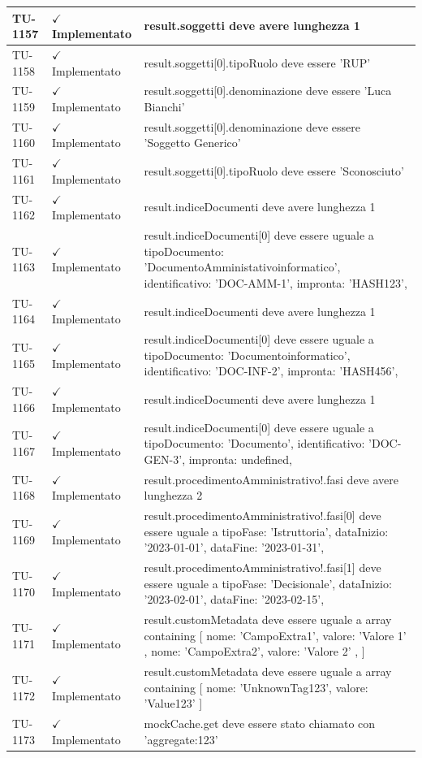 ﻿\documentclass[a4paper,12pt]{article}
\newcommand{\ok}{\textcolor{green!60!black}{$\checkmark$ Implementato}}
\begin{document}
\begin{longtable}{|p{2cm}|p{3.5cm}|p{9.5cm}|}
\hline
TU-1157 & \ok & result.soggetti deve avere lunghezza 1 \\
\hline
TU-1158 & \ok & result.soggetti[0].tipoRuolo deve essere 'RUP' \\
\hline
TU-1159 & \ok & result.soggetti[0].denominazione deve essere 'Luca Bianchi' \\
\hline
TU-1160 & \ok & result.soggetti[0].denominazione deve essere 'Soggetto Generico' \\
\hline
TU-1161 & \ok & result.soggetti[0].tipoRuolo deve essere 'Sconosciuto' \\
\hline
TU-1162 & \ok & result.indiceDocumenti deve avere lunghezza 1 \\
\hline
TU-1163 & \ok & result.indiceDocumenti[0] deve essere uguale a { tipoDocumento: 'DocumentoAmministativoinformatico', identificativo: 'DOC-AMM-1', impronta: 'HASH123', } \\
\hline
TU-1164 & \ok & result.indiceDocumenti deve avere lunghezza 1 \\
\hline
TU-1165 & \ok & result.indiceDocumenti[0] deve essere uguale a { tipoDocumento: 'Documentoinformatico', identificativo: 'DOC-INF-2', impronta: 'HASH456', } \\
\hline
TU-1166 & \ok & result.indiceDocumenti deve avere lunghezza 1 \\
\hline
TU-1167 & \ok & result.indiceDocumenti[0] deve essere uguale a { tipoDocumento: 'Documento', identificativo: 'DOC-GEN-3', impronta: undefined, } \\
\hline
TU-1168 & \ok & result.procedimentoAmministrativo!.fasi deve avere lunghezza 2 \\
\hline
TU-1169 & \ok & result.procedimentoAmministrativo!.fasi[0] deve essere uguale a { tipoFase: 'Istruttoria', dataInizio: '2023-01-01', dataFine: '2023-01-31', } \\
\hline
TU-1170 & \ok & result.procedimentoAmministrativo!.fasi[1] deve essere uguale a { tipoFase: 'Decisionale', dataInizio: '2023-02-01', dataFine: '2023-02-15', } \\
\hline
TU-1171 & \ok & result.customMetadata deve essere uguale a array containing [ { nome: 'CampoExtra1', valore: 'Valore 1' }, { nome: 'CampoExtra2', valore: 'Valore 2' }, ] \\
\hline
TU-1172 & \ok & result.customMetadata deve essere uguale a array containing [{ nome: 'UnknownTag123', valore: 'Value123' }] \\
\hline
TU-1173 & \ok & mockCache.get deve essere stato chiamato con 'aggregate:123' \\

\end{longtable}
\end{document}
